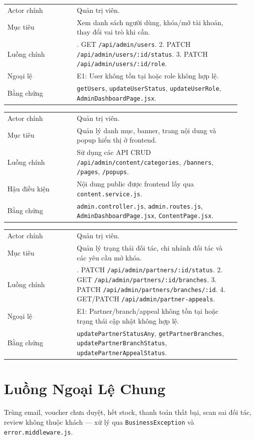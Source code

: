 \begin{longtable}{>{\raggedright\arraybackslash}p{0.28\linewidth}>{\raggedright\arraybackslash}p{0.66\linewidth}}
Actor chính & Quản trị viên.\\
Mục tiêu & Xem danh sách người dùng, khóa/mở tài khoản, thay đổi vai trò khi cần.\\
Luồng chính & 1. GET \texttt{/api/admin/users}. 2. PATCH \texttt{/api/admin/users/:id/status}. 3. PATCH \texttt{/api/admin/users/:id/role}.\\
Ngoại lệ & E1: User không tồn tại hoặc role không hợp lệ.\\
Bằng chứng & \texttt{getUsers}, \texttt{updateUserStatus}, \texttt{updateUserRole}, \texttt{AdminDashboardPage.jsx}.\\
\end{longtable}

\begin{longtable}{>{\raggedright\arraybackslash}p{0.28\linewidth}>{\raggedright\arraybackslash}p{0.66\linewidth}}
Actor chính & Quản trị viên.\\
Mục tiêu & Quản lý danh mục, banner, trang nội dung và popup hiển thị ở frontend.\\
Luồng chính & Sử dụng các API CRUD \texttt{/api/admin/content/categories}, \texttt{/banners}, \texttt{/pages}, \texttt{/popups}.\\
Hậu điều kiện & Nội dung public được frontend lấy qua \texttt{content.service.js}.\\
Bằng chứng & \texttt{admin.controller.js}, \texttt{admin.routes.js}, \texttt{AdminDashboardPage.jsx}, \texttt{ContentPage.jsx}.\\
\end{longtable}

\begin{longtable}{>{\raggedright\arraybackslash}p{0.28\linewidth}>{\raggedright\arraybackslash}p{0.66\linewidth}}
Actor chính & Quản trị viên.\\
Mục tiêu & Quản lý trạng thái đối tác, chi nhánh đối tác và các yêu cầu mở khóa.\\
Luồng chính & 1. PATCH \texttt{/api/admin/partners/:id/status}. 2. GET \texttt{/api/admin/partners/:id/branches}. 3. PATCH \texttt{/api/admin/partners/branches/:id}. 4. GET/PATCH \texttt{/api/admin/partner-appeals}.\\
Ngoại lệ & E1: Partner/branch/appeal không tồn tại hoặc trạng thái cập nhật không hợp lệ.\\
Bằng chứng & \texttt{updatePartnerStatusAny}, \texttt{getPartnerBranches}, \texttt{updatePartnerBranchStatus}, \texttt{updatePartnerAppealStatus}.\\
\end{longtable}

\section{Luồng Ngoại Lệ Chung}
Trùng email, voucher chưa duyệt, hết stock, thanh toán thất bại, scan sai đối tác, review không thuộc khách — xử lý qua \texttt{BusinessException} và \texttt{error.middleware.js}.
